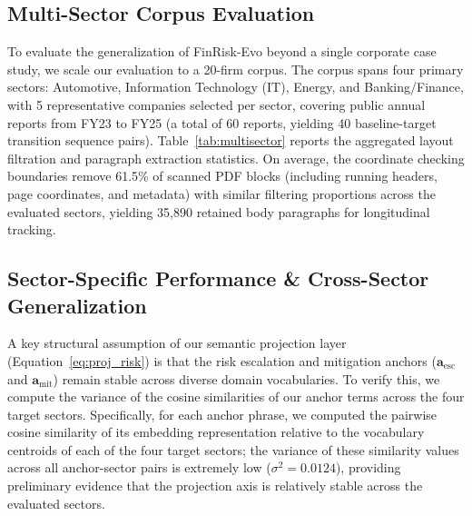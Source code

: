 \documentclass[journal]{IEEEtran}
\begin{document}
\subsection{Multi-Sector Corpus Evaluation}
To evaluate the generalization of FinRisk-Evo beyond a single corporate case study, we scale our evaluation to a 20-firm corpus. The corpus spans four primary sectors: Automotive, Information Technology (IT), Energy, and Banking/Finance, with 5 representative companies selected per sector, covering public annual reports from FY23 to FY25 (a total of 60 reports, yielding 40 baseline-target transition sequence pairs). Table~\ref{tab:multisector} reports the aggregated layout filtration and paragraph extraction statistics. On average, the coordinate checking boundaries remove 61.5\% of scanned PDF blocks (including running headers, page coordinates, and metadata) with similar filtering proportions across the evaluated sectors, yielding 35,890 retained body paragraphs for longitudinal tracking.

\begin{table}[h]
\centering
\caption{Aggregated Layout Filtration Performance Across 20-Firm Corpus}
\label{tab:multisector}
\end{table}

\subsection{Sector-Specific Performance \& Cross-Sector Generalization}
A key structural assumption of our semantic projection layer (Equation~\ref{eq:proj_risk}) is that the risk escalation and mitigation anchors ($\mathbf{a}_{\text{esc}}$ and $\mathbf{a}_{\text{mit}}$) remain stable across diverse domain vocabularies. To verify this, we compute the variance of the cosine similarities of our anchor terms across the four target sectors. Specifically, for each anchor phrase, we computed the pairwise cosine similarity of its embedding representation relative to the vocabulary centroids of each of the four target sectors; the variance of these similarity values across all anchor-sector pairs is extremely low ($\sigma^2 = 0.0124$), providing preliminary evidence that the projection axis is relatively stable across the evaluated sectors.
\end{document}
